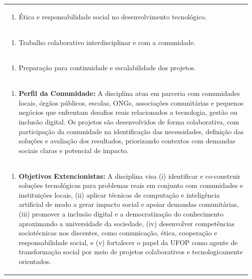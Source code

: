 \documentclass[11pt]{article}
\begin{document}
\begin{center}
\begin{longtable}{|p{4cm}|p{4cm}|p{4cm}|p{4cm}|}
\multicolumn{4}{|p{\dimexpr 16cm + 6\tabcolsep\relax}|}{\begin{enumerate}[start=8]\item Ética e responsabilidade social no desenvolvimento tecnológico.\end{enumerate}}\\
\multicolumn{4}{|p{\dimexpr 16cm + 6\tabcolsep\relax}|}{\begin{enumerate}[start=9]\item Trabalho colaborativo interdisciplinar e com a comunidade.\end{enumerate}}\\
\multicolumn{4}{|p{\dimexpr 16cm + 6\tabcolsep\relax}|}{\begin{enumerate}[start=10]\item Preparação para continuidade e escalabilidade dos projetos.\end{enumerate}}\\
\multicolumn{4}{|p{\dimexpr 16cm + 6\tabcolsep\relax}|}{\begin{enumerate}[start=11]\item \textbf{Perfil da Comunidade:} A disciplina atua em parceria com comunidades locais, órgãos públicos, escolas, ONGs, associações comunitárias e pequenos negócios que enfrentam desafios reais relacionados a tecnologia, gestão ou inclusão digital. Os projetos são desenvolvidos de forma colaborativa, com participação da comunidade na identificação das necessidades, definição das soluções e avaliação dos resultados, priorizando contextos com demandas sociais claras e potencial de impacto.\end{enumerate}}\\
\multicolumn{4}{|p{\dimexpr 16cm + 6\tabcolsep\relax}|}{\begin{enumerate}[start=12]\item \textbf{Objetivos Extencionistas:} A disciplina visa (i) identificar e co-construir soluções tecnológicas para problemas reais em conjunto com comunidades e instituições locais, (ii) aplicar técnicas de computação e inteligência artificial de modo a gerar impacto social e apoiar demandas comunitárias, (iii) promover a inclusão digital e a democratização do conhecimento aproximando a universidade da sociedade, (iv) desenvolver competências sociotécnicas nos discentes, como comunicação, ética, cooperação e responsabilidade social, e (v) fortalecer o papel da UFOP como agente de transformação social por meio de projetos colaborativos e tecnologicamente orientados.\end{enumerate}}\\

\end{longtable}
\end{center}
\end{document}
